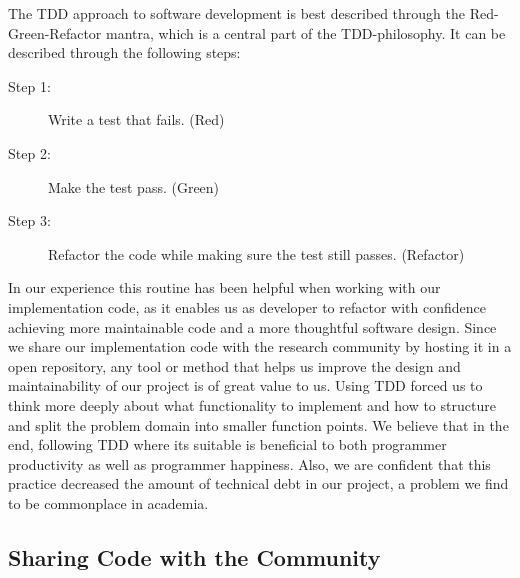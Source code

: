 The TDD approach to software development is best described through the
Red-Green-Refactor mantra, which is a central part of the
TDD-philosophy. It can be described through the following steps:

\begin{description}
    \item[Step 1:] Write a test that fails. (Red)
    \item[Step 2:] Make the test pass. (Green)
    \item[Step 3:] Refactor the code while making sure the test
        still passes. (Refactor)
\end{description}

In our experience this routine has been helpful when working
with our implementation code, as it enables us as developer to
refactor with confidence achieving more maintainable code and a
more thoughtful software design. Since we share our
implementation code with the research community by hosting it in
a open repository, any tool or method that helps us improve the
design and maintainability of our project is of great value to
us. Using TDD forced us to think more deeply about what
functionality to implement and how to structure and split the
problem domain into smaller function points. We believe that in
the end, following TDD where its suitable is beneficial to both
programmer productivity as well as programmer happiness. Also,
we are confident that this practice decreased the amount of
technical debt in our project, a problem we find to be commonplace in academia.

\subsection{Sharing Code with the Community}
